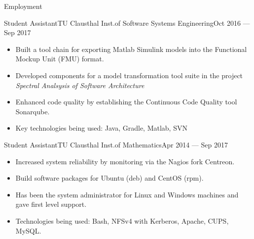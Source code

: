 \documentclass[]{mcdowellcv}
\begin{document}
\begin{cvsection}{Employment}
\begin{cvsubsection}{Student Assistant}{TU Clausthal Inst.\@ of Software Systems Engineering}{Oct 2016 --- Sep 2017}
\bigskip
\begin{itemize}
\item Built a tool chain for exporting Matlab Simulink models into the Functional Mockup Unit (FMU) format.
\item Developed components for a model transformation tool suite in the project \emph{Spectral Analsysis of Software Architecture}
\item Enhanced code quality by establishing the Continuous Code Quality tool Sonarqube.
\item Key technologies being used: Java, Gradle, Matlab, SVN
\end{itemize}
\end{cvsubsection}

\begin{cvsubsection}{Student Assistant}{TU Clausthal Inst.\@ of Mathematics}{Apr 2014 --- Sep 2017}
\bigskip
\begin{itemize}
\item Increased system reliability by monitoring via the Nagios fork Centreon.
\item Build software packages for Ubuntu (deb) and CentOS (rpm).
\item Has been the system administrator for Linux and Windows machines and gave first level support.
\item Technologies being used: Bash, NFSv4 with Kerberos, Apache, CUPS, MySQL.
\end{itemize}
\end{cvsubsection}

\end{cvsection}
\end{document}
